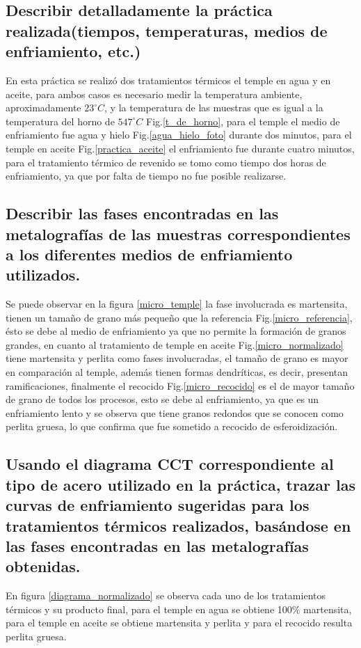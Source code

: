 \documentclass[a4paper, 9pt]{article}
\begin{document}
\subsection{Describir detalladamente la práctica realizada(tiempos, temperaturas, medios de enfriamiento, etc.)}
En esta práctica se realizó dos tratamientos térmicos el temple en agua y en aceite, para ambos casos es necesario medir la temperatura ambiente, aproximadamente $23^{\circ}C$, y la temperatura de las muestras que es igual a la temperatura del horno de $547^{\circ}C$ Fig.\ref{t_de_horno}, para el temple el medio de enfriamiento fue agua y hielo Fig.\ref{agua_hielo_foto} durante dos minutos, para el temple en aceite Fig.\ref{practica_aceite} el enfriamiento fue durante cuatro minutos, para el tratamiento térmico de revenido se tomo como tiempo dos horas de enfriamiento, ya que por falta de tiempo no fue posible realizarse.
\subsection{Describir las fases encontradas en las metalografías de las muestras correspondientes a los diferentes medios de enfriamiento utilizados.}
Se puede observar en la figura \ref{micro_temple} la fase involucrada es martensita, tienen un tamaño de grano más pequeño que la referencia Fig.\ref{micro_referencia}, ésto se debe al medio de enfriamiento ya que no permite la formación de granos grandes, en cuanto al tratamiento de temple en aceite Fig.\ref{micro_normalizado} tiene martensita y perlita como fases involucradas, el tamaño de grano es mayor en comparación al temple, además tienen formas dendríticas, es decir, presentan ramificaciones, finalmente el recocido Fig.\ref{micro_recocido} es el de mayor tamaño de grano de todos los procesos, esto se debe al enfriamiento, ya que es un enfriamiento lento y se observa que tiene granos redondos que se conocen como perlita gruesa, lo que confirma que fue sometido a recocido de esferoidización.

\subsection{Usando el diagrama CCT correspondiente al tipo de acero utilizado en la práctica, trazar las curvas de enfriamiento sugeridas para los tratamientos térmicos realizados, basándose en las fases encontradas en las metalografías obtenidas.}
En figura \ref{diagrama_normalizado} se observa cada uno de los tratamientos térmicos y su producto final, para el temple en agua se obtiene 100\% martensita, para el temple en aceite se obtiene martensita y perlita y para el recocido resulta perlita gruesa.\\
\end{document}
